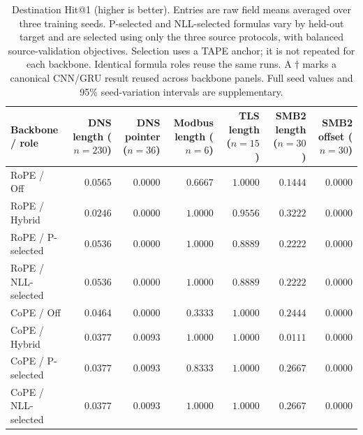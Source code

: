 \begin{table}[tb]
\centering
\small
\setlength{\tabcolsep}{5pt}
\caption{Destination Hit@1 (higher is better). Entries are raw field means averaged over three training seeds. P-selected and NLL-selected formulas vary by held-out target and are selected using only the three source protocols, with balanced source-validation objectives. Selection uses a TAPE anchor; it is not repeated for each backbone. Identical formula roles reuse the same runs. A $\dagger$ marks a canonical CNN/GRU result reused across backbone panels. Full seed values and 95\% seed-variation intervals are supplementary.}
\label{tab:lapa-v17-hit1}
\begin{tabular}{l*{6}{r}}
\toprule
Backbone / role & \shortstack{DNS\\length\\($n=230$)} & \shortstack{DNS\\pointer\\($n=36$)} & \shortstack{Modbus\\length\\($n=6$)} & \shortstack{TLS\\length\\($n=15$)} & \shortstack{SMB2\\length\\($n=30$)} & \shortstack{SMB2\\offset\\($n=30$)} \\
\midrule
RoPE / Off & $0.0565$ & $0.0000$ & $0.6667$ & $1.0000$ & $0.1444$ & $0.0000$ \\
RoPE / Hybrid & $0.0246$ & $0.0000$ & $1.0000$ & $0.9556$ & $0.3222$ & $0.0000$ \\
RoPE / P-selected & $0.0536$ & $0.0000$ & $1.0000$ & $0.8889$ & $0.2222$ & $0.0000$ \\
RoPE / NLL-selected & $0.0536$ & $0.0000$ & $1.0000$ & $0.8889$ & $0.2222$ & $0.0000$ \\
\addlinespace[3pt]
CoPE / Off & $0.0464$ & $0.0000$ & $0.3333$ & $1.0000$ & $0.2444$ & $0.0000$ \\
CoPE / Hybrid & $0.0377$ & $0.0093$ & $1.0000$ & $1.0000$ & $0.0111$ & $0.0000$ \\
CoPE / P-selected & $0.0377$ & $0.0093$ & $0.8333$ & $1.0000$ & $0.2667$ & $0.0000$ \\
CoPE / NLL-selected & $0.0377$ & $0.0093$ & $1.0000$ & $1.0000$ & $0.2667$ & $0.0000$ \\

\end{tabular}
\end{table}
